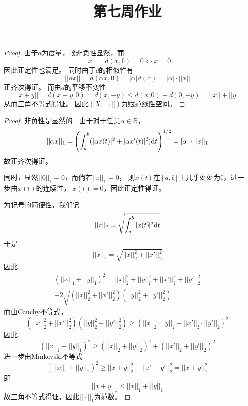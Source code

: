 \documentclass[cn]{homework}
\title{第七周作业}
\begin{document}
    \maketitle

    \problem
    \begin{proof}
        由于$d$为度量，故非负性显然，而
        \[||x||=d(x,0)=0\Leftrightarrow x=0\]
        因此正定性也满足。
        同时由于$d$的相似性有
        \[||\alpha x||=d(\alpha x,0)=|\alpha|d(x)
        =|\alpha|\cdot||x||\]
        正齐次得证。
        而由$d$的平移不变性
        \[||x+y||=d(x+y,0)=d(x,-y)
        \leq d(x,0)+d(0,-y)=||x||+||y||\]
        从而三角不等式得证。
        因此$(X,||\cdot||)$为赋范线性空间。
    \end{proof}

    \problem
    \begin{subproblem}
        \item
        \begin{proof}
            非负性是显然的，由于对于任意$\alpha\in\mathbb R$，
            \[||\alpha x||_1=
            \left(\int_a^b(|\alpha x(t)|^2+|\alpha x'(t)|^2)\mathrm d t\right)^{1/2}
            =|\alpha|\cdot||x||_1\]
            故正齐次得证。

            同时，显然$||0||_1=0$，而倘若$||x||_1=0$，
            则$x(t)$在$[a,b]$上几乎处处为0，进一步由$x(t)$的连续性，
            $x(t)=0$，因此正定性得证。

            为记号的简便性，我们记
            \[||x||_2=\sqrt{\int_a^b|x(t)|^2\mathrm d t}\]
            于是
            \[||x||_1=\sqrt{||x||_2^2+||x'||_2^2}\]
            因此
            \begin{multline*}
            (||x||_1+||y||_1)^2=
            ||x||_2^2+||y||_2^2
            +||x'||_2^2+||y'||_2^2\\
            +2\sqrt{(||x||_2^2+||x'||_2^2)(||y||_2^2+||y'||_2^2)}
            \end{multline*}
            而由Cauchy不等式，
            \[(||x||_2^2+||x'||_2^2)(||y||_2^2+||y'||_2^2)
            \geq(||x||_2\cdot||y||_2+||x'||_2\cdot||y'||_2)^2\]
            因此
            \[(||x||_1+||y||_1)^2
            \geq(||x||_2+||y||_2)^2+(||x'||_2+||y'||_2)^2\]
            进一步由Minkovski不等式
            \[(||x||_1+||y||_1)^2\geq ||x+y||_2^2+||x'+y'||_2^2
            =||x+y||_1^2\]
            即
            \[||x+y||_1\leq||x||_1+||y||_1\]
            故三角不等式得证，因此$||\cdot||_1$为范数。
        \end{proof}


\end{subproblem}
\end{document}
